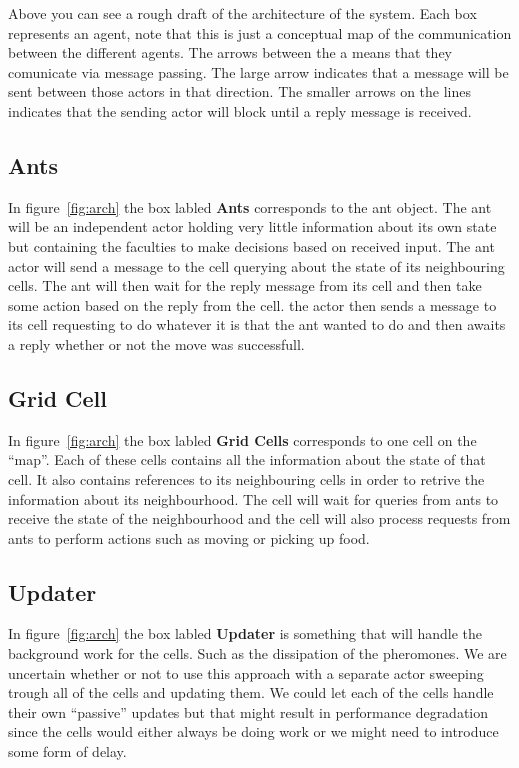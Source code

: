 \documentclass[a4paper]{article}
\begin{document}
Above you can see a rough draft of the architecture of the system. Each box
represents an agent, note that this is just a conceptual map of the
communication between the different agents. The arrows between the a means that
they comunicate via message passing.
The large arrow indicates that a message will be sent between those actors in that
direction. The smaller arrows on the lines indicates that the sending actor
will block until a reply message is received.

\subsection{Ants}
In figure~\ref{fig:arch} the box labled \textbf{Ants} corresponds to the ant
object.
The ant will be an independent actor holding very little information about its
own state but containing the faculties to make decisions based on received
input. The ant actor will send a message to the cell querying about the state
of its neighbouring cells. The ant will then wait for the reply message from its
cell and then take some action based on the reply from the cell. the actor then
sends a message to its cell requesting to do whatever it is that the ant wanted
to do and then awaits a reply whether or not the move was successfull.

\subsection{Grid Cell}
In figure~\ref{fig:arch} the box labled \textbf{Grid Cells} corresponds to one
cell on the ``map''. Each of these cells contains all the information about the state of
that cell. It also contains references to its neighbouring cells in order to
retrive the information about its neighbourhood. The cell will wait for queries
from ants to receive the state of the neighbourhood and the cell will also
process requests from ants to perform actions such as moving or picking up food.

\subsection{Updater}
In figure~\ref{fig:arch} the box labled \textbf{Updater} is something that will
handle the background work for the cells. Such as the dissipation of the pheromones.
We are uncertain whether or not to use this approach with a separate actor sweeping
trough all of the cells and updating them. We could let each of the cells handle
their own ``passive'' updates but that might result in performance degradation
since the cells would either always be doing work or we might need to introduce
some form of delay.
\end{document}
